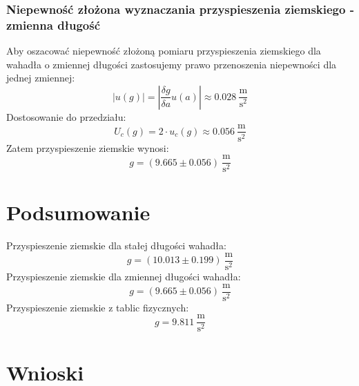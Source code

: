 \documentclass[a4paper,12pts]{article}
\begin{document}
	\subsubsection{Niepewność złożona wyznaczania przyspieszenia ziemskiego - zmienna długość}
	Aby oszacować niepewność złożoną pomiaru przyspieszenia ziemskiego dla wahadła o zmiennej długości zastosujemy prawo przenoszenia niepewności dla jednej zmiennej:
	\begin{equation}
		|u(g)| = \left|\frac{\delta g}{\delta a} u(a)\right| \approx 0.028 ~\frac{\textrm{m}}{\textrm{s}^2}
	\end{equation}
	Dostosowanie do przedziału:
	\begin{equation}
		U_c(g) = 2 \cdot u_c(g) \approx 0.056 ~\frac{\textrm{m}}{\textrm{s}^2}
	\end{equation}
	Zatem przyspieszenie ziemskie wynosi:
	$$g = (9.665 \pm 0.056) ~\frac{\textrm{m}}{\textrm{s}^2}$$

	\section{Podsumowanie}
	Przyspieszenie ziemskie dla stałej długości wahadła:
	$$ g = (10.013 \pm 0.199) ~\frac{\textrm{m}}{\textrm{s}^2} $$
	Przyspieszenie ziemskie dla zmiennej długości wahadła:
	$$ g = (9.665 \pm 0.056) ~\frac{\textrm{m}}{\textrm{s}^2} $$
	Przyspieszenie ziemskie z tablic fizycznych:
	$$ g = 9.811 ~\frac{\textrm{m}}{\textrm{s}^2} $$


	\section{Wnioski}
	
		
\end{document}
